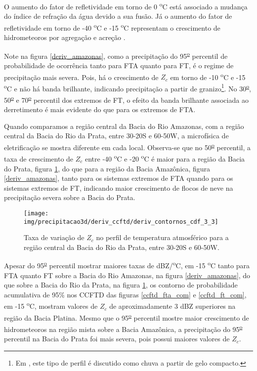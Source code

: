 
O aumento do fator de refletividade em torno de 0 \textsuperscript{o}C está associado a mudança do índice de refração da água devido a sua fusão. Já o aumento do fator de refletividade em torno de -40 \textsuperscript{o}C e -15 \textsuperscript{o}C representam o crescimento de hidrometeoros por agregação e acreção \cite{Fabry1995,Takahashi1978}.

Note na figura \ref{deriv_amazonas}, como a precipitação do 95\textsuperscript{\underline{o}} percentil de probabilidade de ocorrência tanto para FTA quanto para FT, é o regime de precipitação mais severa. Pois, há o crescimento de $Z_c$ em torno de -10 \textsuperscript{o}C e -15 \textsuperscript{o}C e não há banda brilhante, indicando precipitação a partir de granizo\footnote{Em \cite{Fabry1995}, este tipo de perfil é discutido como chuva a partir de gelo compacto.}. No 30\textsuperscript{\underline{o}}, 50\textsuperscript{\underline{o}} e 70\textsuperscript{\underline{o}} percentil dos extremos de FT, o efeito da banda brilhante associada ao derretimento é mais evidente do que para os extremos de FTA. 

Quando comparamos a região central da Bacia do Rio Amazonas, com a região central da Bacia do Rio da Prata, entre 30-20S e 60-50W, a microfísica de eletrificação se mostra diferente em cada local. Observa-se que no 50\textsuperscript{\underline{o}} percentil, a taxa de crescimento de $Z_c$ entre -40 \textsuperscript{o}C e -20 \textsuperscript{o}C é maior para a região da Bacia do Prata, figura \ref{deriv_prata}, do que para a região da Bacia Amazônica, figura \ref{deriv_amazonas}, tanto para os sistemas extremos de FTA quando para os sistemas extremos de FT, indicando maior crescimento de flocos de neve na precipitação severa sobre a Bacia do Prata. 


\begin{figure}[!ht]
  \centering
  \texttt{[image: img/precipitacao3d/deriv\_ccftd/deriv\_contornos\_cdf\_3\_3]}
  \caption{Taxa de variação de $Z_c$ no perfil de temperatura atmosférico para a região central da Bacia do Rio da Prata, entre 30-20S e 60-50W.}
  \label{deriv_prata}  
\end{figure} 

Apesar do 95\textsuperscript{\underline{o}} percentil mostrar maiores taxas de dBZ/\textsuperscript{o}C, em -15 \textsuperscript{o}C tanto para FTA quanto FT sobre a Bacia do Rio Amazonas, na figura \ref{deriv_amazonas}, do que sobre a Bacia do Rio da Prata, na figura \ref{deriv_prata}, os contorno de probabilidade acumulativa de 95\% nos CCFTD das figuras \ref{ccftd_fta_com} e \ref{ccftd_ft_com}, em -15 \textsuperscript{o}C, mostram valores de $Z_c$ de aproximadamente 3 dBZ superiores na região da Bacia Platina. Mesmo que o 95\textsuperscript{\underline{o}} percentil mostre maior crescimento de hidrometeoros na região mista sobre a Bacia Amazônica, a precipitação do 95\textsuperscript{\underline{o}} percentil na Bacia do Prata foi mais severa, pois possui maiores valores de $Z_c$.


